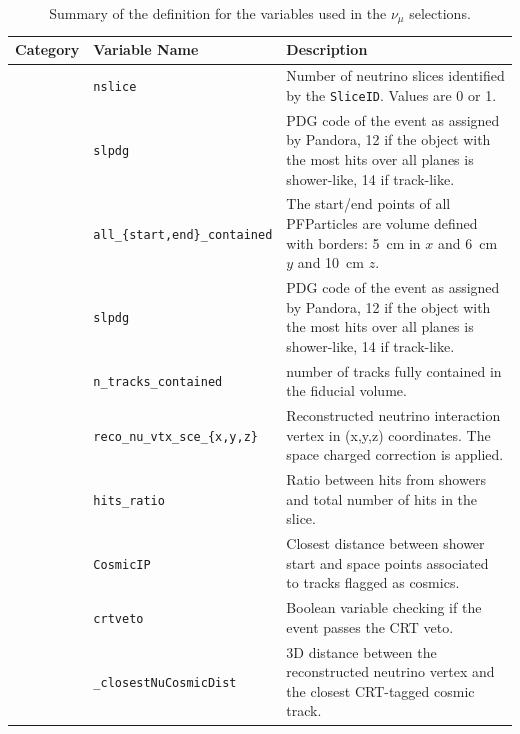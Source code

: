 \begin{table}[ht]
\caption{\label{tab:numuvariableSummary} Summary of the definition for the variables used in the $\nu_{\mu}$ selections.}
\centering
\begin{tabular}{ m{} | m{} | m{}  }
Category & Variable Name & Description  \\
\hline

\multicolumn{1}{l|}{} & \texttt{nslice} &  Number of neutrino slices identified by the \texttt{SliceID}. Values are  0 or 1.\\  \cline{2-3}
\multicolumn{1}{l|}{} & \texttt{slpdg} &  PDG code of the event as assigned by Pandora, 12 if the object with the most hits over all planes is shower-like, 14 if track-like.\\  \cline{2-3}
\multicolumn{1}{l|}{} & \texttt{all\_\{start,end\}\_contained} &  The start/end points of all PFParticles are volume defined with borders: \SI{5}{\cm} in $x$ and \SI{6}{\cm} $y$ and \SI{10}{\cm} $z$.\\  \cline{2-3}
\multicolumn{1}{l|}{} & \texttt{slpdg} &  PDG code of the event as assigned by Pandora, 12 if the object with the most hits over all planes is shower-like, 14 if track-like.\\  \cline{2-3}
\multicolumn{1}{l|}{} & \texttt{n\_tracks\_contained} &  number of tracks fully contained in the fiducial volume.\\  \cline{2-3}
\multicolumn{1}{l|}{} & \texttt{reco\_nu\_vtx\_sce\_\{x,y,z\}} & Reconstructed neutrino interaction vertex in (x,y,z) coordinates. The space charged correction is applied.  \\  \cline{2-3}
\parbox[t]{2mm}{} & \texttt{hits\_ratio} & Ratio between hits from showers and total number of hits in the slice. \\  
 & \texttt{CosmicIP} & Closest distance between shower start and space points associated to tracks flagged as cosmics. \\  
 & \texttt{crtveto} & Boolean variable checking if the event passes the CRT veto. \\  
 & \texttt{\_closestNuCosmicDist} &  3D distance between the reconstructed neutrino vertex and the closest CRT-tagged cosmic track. \\  
\hline



\end{tabular}
\end{table}
